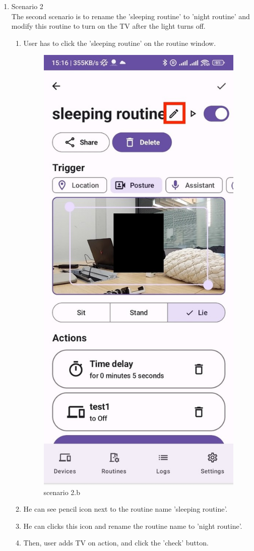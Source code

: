 \begin{enumerate}
    \item Scenario 2\\
    The second scenario is to rename the 'sleeping routine' to 'night routine' and modify this routine to turn on the TV after the light turns off.\\
    \begin{enumerate}
        \item User has to click the 'sleeping routine' on the routine window. \\
        \begin{figure}
            \centering
            \includegraphics[width=0.5\linewidth]{imgs//usercase/scnario2-1.jpg}
            \caption{scenario 2.b}
            \label{fig:enter-label}
        \end{figure}
        \item He can see pencil icon next to the routine name 'sleeping routine'. \\
        \item He can clicks this icon and rename the routine name to 'night routine'. \\
        \item Then, user adds TV on action, and click the 'check' button. \\

\end{enumerate}
\end{enumerate}
